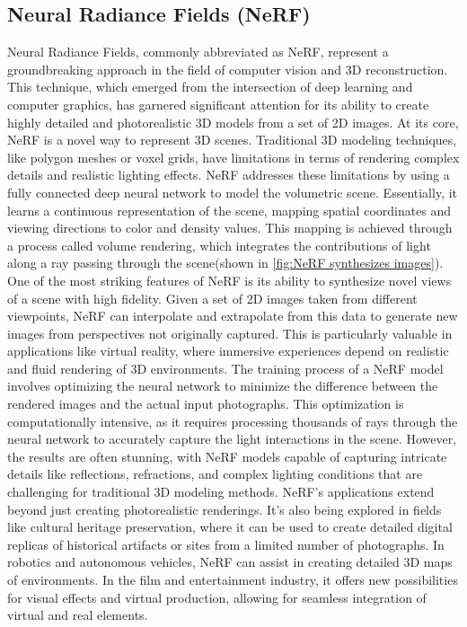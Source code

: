 \subsection{Neural Radiance Fields (NeRF)}
\label{sec:Neural Radiance Fields (NeRF)}
\singlespacing
Neural Radiance Fields\cite{lin2021inerf}, commonly abbreviated as NeRF, represent a groundbreaking approach in the field of computer vision and 3D reconstruction. This technique, which emerged from the intersection of deep learning and computer graphics, has garnered significant attention for its ability to create highly detailed and photorealistic 3D models from a set of 2D images.
\singlespacing
At its core, NeRF is a novel way to represent 3D scenes. Traditional 3D modeling techniques, like polygon meshes or voxel grids, have limitations in terms of rendering complex details and realistic lighting effects. NeRF addresses these limitations by using a fully connected deep neural network to model the volumetric scene. Essentially, it learns a continuous representation of the scene, mapping spatial coordinates and viewing directions to color and density values. This mapping is achieved through a process called volume rendering, which integrates the contributions of light along a ray passing through the scene(shown in \ref{fig:NeRF synthesizes images}).
\singlespacing
One of the most striking features of NeRF is its ability to synthesize novel views of a scene with high fidelity. Given a set of 2D images taken from different viewpoints, NeRF can interpolate and extrapolate from this data to generate new images from perspectives not originally captured. This is particularly valuable in applications like virtual reality, where immersive experiences depend on realistic and fluid rendering of 3D environments.
The training process of a NeRF model involves optimizing the neural network to minimize the difference between the rendered images and the actual input photographs. This optimization is computationally intensive, as it requires processing thousands of rays through the neural network to accurately capture the light interactions in the scene. However, the results are often stunning, with NeRF models capable of capturing intricate details like reflections, refractions, and complex lighting conditions that are challenging for traditional 3D modeling methods.
\singlespacing
NeRF's applications extend beyond just creating photorealistic renderings. It's also being explored in fields like cultural heritage preservation, where it can be used to create detailed digital replicas of historical artifacts or sites from a limited number of photographs. In robotics and autonomous vehicles, NeRF can assist in creating detailed 3D maps of environments. In the film and entertainment industry, it offers new possibilities for visual effects and virtual production, allowing for seamless integration of virtual and real elements.
